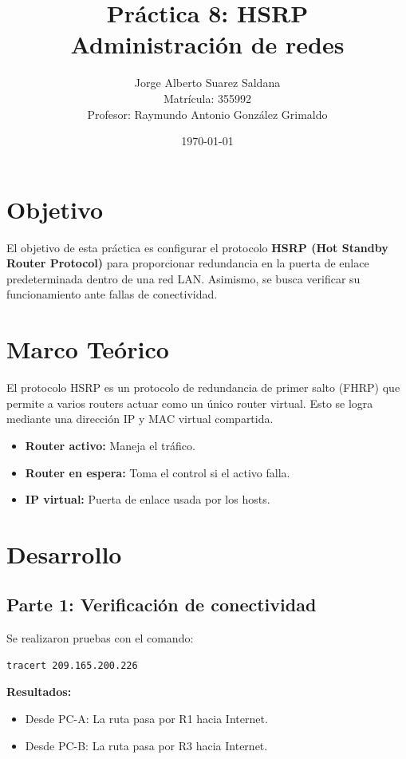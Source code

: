 \documentclass[12pt]{article}
\title{
Práctica 8: HSRP\\[0.5em]
\large Administración de redes
}
\author{
Jorge Alberto Suarez Saldana\\
\small Matrícula: 355992\\
\small Profesor: Raymundo Antonio González Grimaldo
}
\date{\today}
\begin{document}
\maketitle

\section{Objetivo}
El objetivo de esta práctica es configurar el protocolo \textbf{HSRP (Hot Standby Router Protocol)} para proporcionar redundancia en la puerta de enlace predeterminada dentro de una red LAN. Asimismo, se busca verificar su funcionamiento ante fallas de conectividad.

\section{Marco Teórico}

El protocolo HSRP es un protocolo de redundancia de primer salto (FHRP) que permite a varios routers actuar como un único router virtual. Esto se logra mediante una dirección IP y MAC virtual compartida.

\begin{itemize}
    \item \textbf{Router activo:} Maneja el tráfico.
    \item \textbf{Router en espera:} Toma el control si el activo falla.
    \item \textbf{IP virtual:} Puerta de enlace usada por los hosts.
\end{itemize}

\section{Desarrollo}

\subsection{Parte 1: Verificación de conectividad}

Se realizaron pruebas con el comando:

\begin{verbatim}
tracert 209.165.200.226
\end{verbatim}

\textbf{Resultados:}
\begin{itemize}
    \item Desde PC-A: La ruta pasa por R1 hacia Internet.
    \item Desde PC-B: La ruta pasa por R3 hacia Internet.
\end{itemize}
\end{document}
